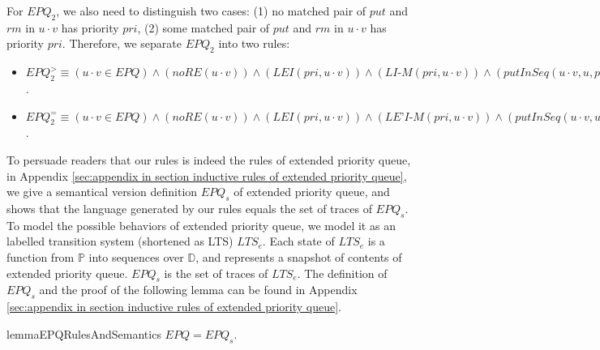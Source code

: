 For $\textit{EPQ}_2$, we also need to distinguish two cases: (1) no matched pair of $\textit{put}$ and $\textit{rm}$ in $u \cdot v$ has priority $\textit{pri}$, (2) some matched pair of $\textit{put}$ and $\textit{rm}$ in $u \cdot v$ has priority $\textit{pri}$. Therefore, we separate $\textit{EPQ}_2$ into two rules:

\begin{itemize}
\setlength{\itemsep}{0.5pt}
\item[-] $\textit{EPQ}_2^{>} \equiv
(u \cdot v \in \textit{EPQ}) \wedge
(\textit{noRE}(u \cdot v)) \wedge
(\textit{LEI}(\textit{pri},u \cdot v)) \wedge
(\textit{LI-M}(\textit{pri},u \cdot v)) \wedge
(\textit{putInSeq}(u \cdot v,u,\textit{pri}))
\Rightarrow
(u \cdot \textit{put}(\textit{itm},\textit{pri}) \cdot v \in \textit{EPQ})$.

\item[-] $\textit{EPQ}_2^{=} \equiv
(u \cdot v \in \textit{EPQ}) \wedge
(\textit{noRE}(u \cdot v)) \wedge
(\textit{LEI}(\textit{pri},u \cdot v)) \wedge
(\textit{LE'I-M}(\textit{pri},u \cdot v)) \wedge
(\textit{putInSeq}(u \cdot v,u,\textit{pri}))
\Rightarrow
(u \cdot \textit{put}(\textit{itm},\textit{pri}) \cdot v \in \textit{EPQ})$.
\end{itemize}

To persuade readers that our rules is indeed the rules of extended priority queue, in Appendix \ref{sec:appendix in section inductive rules of extended priority queue}, we give a semantical version definition $\textit{EPQ}_s$ of extended priority queue, and shows that the language generated by our rules equals the set of traces of $\textit{EPQ}_s$. To model the possible behaviors of extended priority queue, we model it as an labelled transition system (shortened as LTS) $\textit{LTS}_e$. Each state of $\textit{LTS}_e$ is a function from $\mathbb{P}$ into sequences over $\mathbb{D}$, and represents a snapshot of contents of extended priority queue. $\textit{EPQ}_s$ is the set of traces of $\textit{LTS}_e$. The definition of $\textit{EPQ}_s$ and the proof of the following lemma can be found in Appendix \ref{sec:appendix in section inductive rules of extended priority queue}.

\begin{restatable}{lemma}{EPQRulesAndSemantics}
\label{lemma:EPQ rules and semantics}
$\textit{EPQ} = \textit{EPQ}_s$.
\end{restatable}


